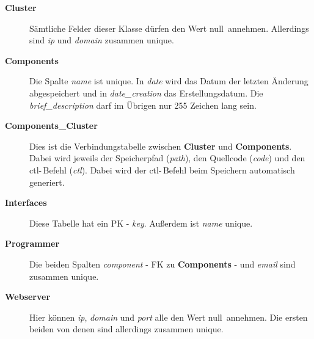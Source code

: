 \begin{description}
  \item[\textbf{Cluster}]
	Sämtliche Felder dieser Klasse dürfen den Wert \glqq null\grqq\ annehmen.
	Allerdings sind \textit{ip} und \textit{domain} zusammen unique.
  \item[\textbf{Components}]
	Die Spalte \textit{name} ist unique. In \textit{date} wird das Datum der
	letzten Änderung abgespeichert und in \textit{date\_creation} das
	Erstellungsdatum. Die \textit{brief\_description} darf im Übrigen nur 255
	Zeichen lang sein.
  \item[\textbf{Components\_Cluster}]
	Dies ist die Verbindungstabelle zwischen \textbf{Cluster} und
	\textbf{Compo\-nents}. Dabei wird jeweils der Speicherpfad (\textit{path}),
	den Quellcode (\textit{code}) und den ctl-\,Befehl (\textit{ctl}). Dabei
	wird der ctl-\,Befehl beim Speichern automatisch generiert.
  \item[\textbf{Interfaces}]
	Diese Tabelle hat ein PK - \textit{key}. Außerdem ist \textit{name} unique.
  \item[\textbf{Programmer}]
	Die beiden Spalten \textit{component} - FK zu \textbf{Components} - und
	\textit{email} sind zusammen unique. 
  \item[\textbf{Webserver}]
	Hier können \textit{ip}, \textit{domain} und \textit{port} alle den Wert
	\glqq null\grqq\ annehmen. Die ersten beiden von denen sind allerdings
	zusammen unique.
\end{description}
